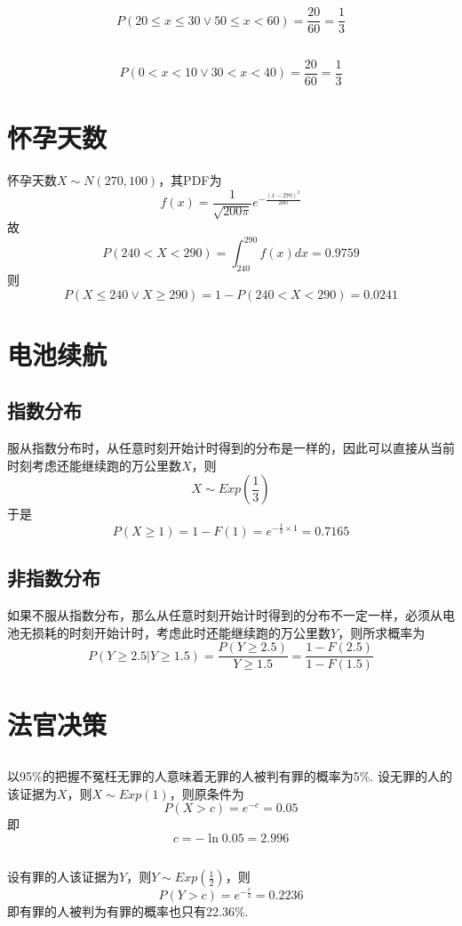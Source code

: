 \documentclass{article}
\begin{document}
\begin{CJK}{UTF8}{gbsn}
\subsection{}
$$ P(20\leq x\leq 30 \lor 50\leq x<60)=\frac{20}{60}=\frac{1}{3} $$
\subsection{}
$$ P(0<x<10 \lor 30<x<40)=\frac{20}{60}=\frac{1}{3}$$
\section{怀孕天数}
怀孕天数$X\sim N(270,100)$，其PDF为
$$ f(x)=\frac{1}{\sqrt{200\pi}}e^{-\frac{(x-270)^{2}}{200}}$$
故
$$ P(240<X<290)=\int_{240}^{290}f(x)dx=0.9759$$
则
$$ P(X\leq 240 \lor X\geq 290)=1-P(240<X<290)=0.0241$$
\section{电池续航}
\subsection{指数分布}
服从指数分布时，从任意时刻开始计时得到的分布是一样的，因此可以直接从当前时刻考虑还能继续跑的万公里数$X$，则
$$ X\sim Exp(\frac{1}{3})$$
于是
$$ P(X\geq 1)=1-F(1)=e^{-\frac{1}{3}\times 1}=0.7165$$
\subsection{非指数分布}
如果不服从指数分布，那么从任意时刻开始计时得到的分布不一定一样，必须从电池无损耗的时刻开始计时，考虑此时还能继续跑的万公里数$Y$，则所求概率为
$$ P(Y\geq 2.5|Y\geq 1.5)=\frac{P(Y\geq 2.5)}{Y\geq 1.5}=\frac{1-F(2.5)}{1-F(1.5)}$$
\section{法官决策}
\subsection{}
以95\%的把握不冤枉无罪的人意味着无罪的人被判有罪的概率为5\%.
设无罪的人的该证据为$X$，则$X\sim Exp(1)$，则原条件为
$$ P(X>c)=e^{-c}=0.05 $$
即
$$ c=-\ln 0.05=2.996 $$
\subsection{}
设有罪的人该证据为$Y$，则$Y\sim Exp(\frac{1}{2})$，则
$$ P(Y>c)=e^{-\frac{c}{2}}=0.2236 $$
即有罪的人被判为有罪的概率也只有22.36\%.

\end{CJK}
\end{document}
